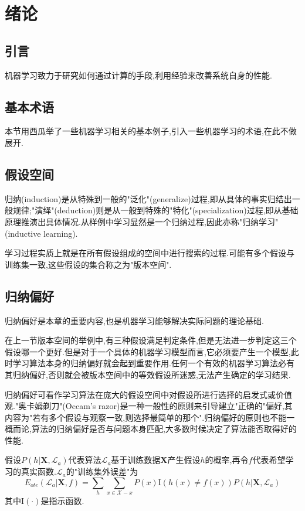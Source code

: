 \chapter{绪论}

\section{引言}

机器学习致力于研究如何通过计算的手段,利用经验来改善系统自身的性能.

\section{基本术语}

本节用西瓜举了一些机器学习相关的基本例子,引入一些机器学习的术语,在此不做展开.

\section{假设空间}

归纳(induction)是从特殊到一般的"泛化"(generalize)过程,即从具体的事实归结出一般规律;"演绎"(deduction)则是从一般到特殊的"特化"(specialization)过程,即从基础原理推演出具体情况.从样例中学习显然是一个归纳过程,因此亦称"归纳学习"(inductive learning).

学习过程实质上就是在所有假设组成的空间中进行搜索的过程.可能有多个假设与训练集一致,这些假设的集合称之为"版本空间".

\section{归纳偏好}

归纳偏好是本章的重要内容,也是机器学习能够解决实际问题的理论基础.

在上一节版本空间的举例中,有三种假设满足判定条件,但是无法进一步判定这三个假设哪一个更好.但是对于一个具体的机器学习模型而言,它必须要产生一个模型,此时学习算法本身的归纳偏好就会起到重要作用.任何一个有效的机器学习算法必有其归纳偏好,否则就会被版本空间中的等效假设所迷惑,无法产生确定的学习结果.

归纳偏好可看作学习算法在庞大的假设空间中对假设所进行选择的启发式或价值观."奥卡姆剃刀"(Occam's razor)是一种一般性的原则来引导建立"正确的"偏好,其内容为"若有多个假设与观察一致,则选择最简单的那个".归纳偏好的原则也不能一概而论,算法的归纳偏好是否与问题本身匹配,大多数时候决定了算法能否取得好的性能.

假设$P(h|\mathbf X,\mathcal L_a)$代表算法$\mathcal L_a$基于训练数据$\mathbf X$产生假设$h$的概率,再令$f$代表希望学习的真实函数.$\mathcal L_a$的"训练集外误差"为
\begin{equation}
E_{ote}(\mathcal L_a|\mathbf X, f)=\sum_h\sum_{x\in\mathcal X-x}P(x)\text{I}(h(x)\ne f(x))P(h|\mathbf X,\mathcal L_a)
\end{equation}
其中$\text{I}(\cdot)$是指示函数.

